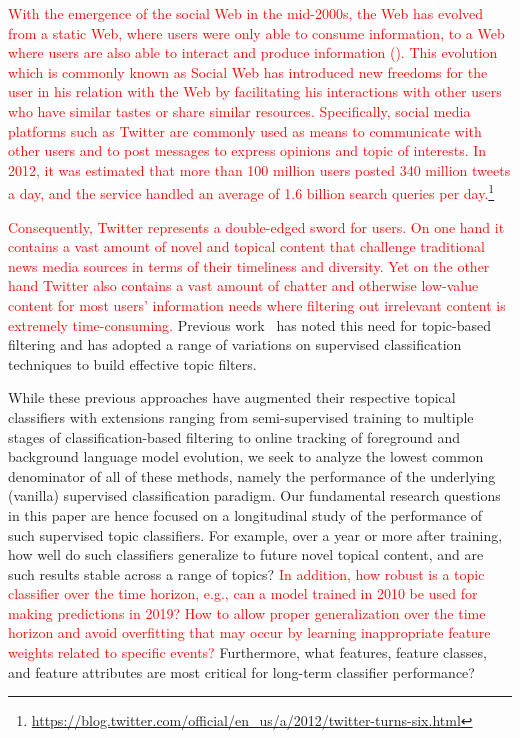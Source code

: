 
\label{sec:introduction}
\textcolor{red}{With the emergence of the social Web in the mid-2000s, the Web has evolved from a static Web, where users were only able to consume information, to a Web where users are also able to interact and produce information (\cite{Bouadjenek2016}). This evolution which is commonly known as Social Web has introduced new freedoms for the user in his relation with the Web by facilitating his interactions with other users who have similar tastes or share similar resources.
Specifically, social media platforms such as Twitter are commonly used as means to communicate with other users and to post messages to express opinions and topic of interests. In 2012, it was estimated that more than 100 million users posted 340 million tweets a day, and the service handled an average of 1.6 billion search queries per day.\footnote{\url{https://blog.twitter.com/official/en_us/a/2012/twitter-turns-six.html}}} 

\textcolor{red}{Consequently, Twitter represents a double-edged sword for users.  On one hand it contains a vast amount of novel and
topical content that challenge traditional news media sources in terms
of their timeliness and diversity.  Yet on the other hand Twitter also
contains a vast amount of chatter and otherwise low-value content for most
users' information needs where filtering out irrelevant content is
extremely time-consuming.}  Previous work~\cite{lin2011smoothing,yang2014large,magdy} 
has noted this need for topic-based filtering and has adopted a range
of variations on supervised classification techniques to build effective
topic filters.

While these previous approaches have augmented their respective topical classifiers with extensions ranging from semi-supervised training to multiple stages of classification-based filtering to online tracking of foreground and background language model evolution, 
we seek to analyze the lowest common denominator
of all of these methods, namely the performance of the underlying (vanilla) supervised 
classification paradigm.
Our fundamental research questions in this paper are hence focused on a longitudinal study 
of the performance of such supervised topic classifiers.  
For example, over a year or more after training, how well do such classifiers generalize to future novel topical content, and are such results stable across a range of topics?  \textcolor{red}{In addition, how robust is a topic classifier over the time horizon, e.g., can a model trained in 2010 be used for making predictions in 2019? How to allow proper generalization over the  time horizon and avoid overfitting that may occur by learning inappropriate feature weights related to specific events?} Furthermore, what features, feature classes, and feature attributes are most critical for long-term classifier performance?  


